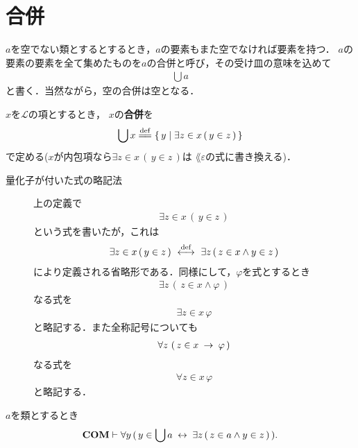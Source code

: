 \section{合併}
	$a$を空でない類とするとするとき，$a$の要素もまた空でなければ要素を持つ．
	$a$の要素の要素を全て集めたものを$a$の合併と呼び，その受け皿の意味を込めて
	\begin{align}
		\bigcup a
	\end{align}
	と書く．当然ながら，空の合併は空となる．
	
	\begin{screen}
		\begin{dfn}[合併]
			$x$を$\mathcal{L}$の項とするとき，
			$x$の{\bf 合併}を
			\begin{align}
				\bigcup x \defeq \Set{y}{\exists z \in x\, (\, y \in z\, )}
				\label{eq:definition_of_union_1}
			\end{align}
			で定める($x$が内包項なら$\exists z \in x\, (\, y \in z\, )$は
			$\lang{\varepsilon}$の式に書き換える)．
		\end{dfn}
	\end{screen}
	
	\begin{description}
		\item[量化子が付いた式の略記法]
		上の定義で
		\begin{align}
			\exists z \in x\, (\, y \in z\, )
		\end{align}
		という式を書いたが，これは
		\begin{align}
			\exists z \in x\, (\, y \in z\, ) \ \overset{\mathrm{def}}{\longleftrightarrow}\  
			\exists z\, (\, z \in x \wedge y \in z\, )
		\end{align}
		により定義される省略形である．同様にして，$\varphi$を式とするとき
		\begin{align}
			\exists z\, \left(\, z \in x \wedge \varphi\, \right)
		\end{align}
		なる式を
		\begin{align}
			\exists z \in x\, \varphi
		\end{align}
		と略記する．また全称記号についても
		\begin{align}
			\forall z\, \left(\, z \in x \hspace{0.25em}\rightarrow\hspace{0.25em} \varphi\, \right)
		\end{align}
		なる式を
		\begin{align}
			\forall z \in x\, \varphi
		\end{align}
		と略記する．
	\end{description}
	
	\begin{screen}
		\begin{thm}[合併の内包性]
		\label{thm:comprehension_of_unions}
			$a$を類とするとき
			\begin{align}
				\mbox{\bf COM} \vdash \forall y\, (\, y \in \bigcup a \hspace{0.25em}\leftrightarrow\hspace{0.25em} 
				\exists z\, (\, z \in a \wedge y \in z\, )\, ).
			\end{align}
		\end{thm}
	\end{screen}
	
